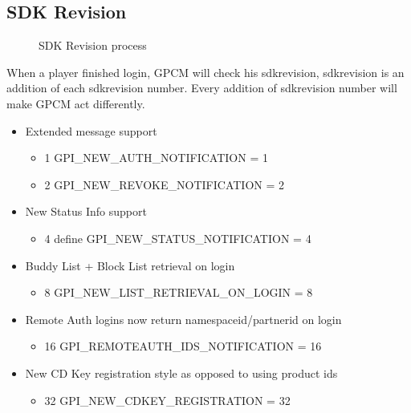 \documentclass[oneside,titlepage,a4paper]{Definition/retrospy} %
\begin{document}
\subsection{SDK Revision}

\begin{figure}[H]
	\centering
	\caption{SDK Revision process}
	\label{SDK Revision process}
\end{figure}
	When a player finished login, GPCM will check his sdkrevision, sdkrevision is an addition of each sdkrevision number. Every addition of sdkrevision number will make GPCM act differently.
\begin{mybox}
	\begin{itemize}
		\item Extended message support
		\begin{itemize}
			\item{1} GPI\_NEW\_AUTH\_NOTIFICATION = 1
			\item{2} GPI\_NEW\_REVOKE\_NOTIFICATION = 2
		\end{itemize}
		
		\item New Status Info support
		\begin{itemize}
			\item{4} define GPI\_NEW\_STATUS\_NOTIFICATION = 4
		\end{itemize}
		
		\item Buddy List + Block List retrieval on login
		\begin{itemize}
			\item{8} GPI\_NEW\_LIST\_RETRIEVAL\_ON\_LOGIN = 8
		\end{itemize}
	\item Remote Auth logins now return namespaceid/partnerid on login
	\begin{itemize}
		\item{16} GPI\_REMOTEAUTH\_IDS\_NOTIFICATION = 16
	\end{itemize}

	\item New CD Key registration style as opposed to using product ids
	\begin{itemize}
		\item{32}  GPI\_NEW\_CDKEY\_REGISTRATION = 32
	\end{itemize}

	\end{itemize}
\end{mybox}
\end{document}
